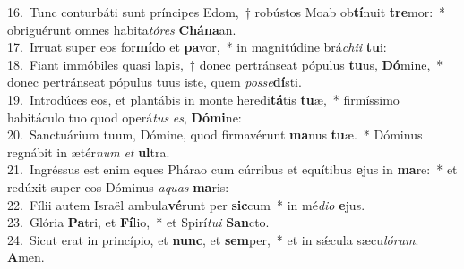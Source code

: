 {16.~}Tunc conturbáti sunt príncipes Edom,~† robústos Moab ob\textbf{tí}nuit \textbf{tre}mor:~* obriguérunt omnes habita\textit{tó}\textit{res} \textbf{Chá}\textbf{na}an.\\
{17.~}Irruat super eos for\textbf{mí}do et \textbf{pa}vor,~* in magnitúdine brá\textit{chi}\textit{i} \textbf{tu}i:\\
{18.~}Fiant immóbiles quasi lapis,~† donec pertránseat pópulus \textbf{tu}us, \textbf{Dó}mine,~* donec pertránseat pópulus tuus iste, quem \textit{pos}\textit{se}\textbf{dí}sti.\\
{19.~}Introdúces eos, et plantábis in monte heredi\textbf{tá}tis \textbf{tu}æ,~* firmíssimo habitáculo tuo quod operá\textit{tus} \textit{es}, \textbf{Dó}\textbf{mi}ne:\\
{20.~}Sanctuárium tuum, Dómine, quod firmavérunt \textbf{ma}nus \textbf{tu}æ.~* Dóminus regnábit in ætér\textit{num} \textit{et} \textbf{ul}tra.\\
{21.~}Ingréssus est enim eques Phárao cum cúrribus et equítibus \textbf{e}jus in \textbf{ma}re:~* et redúxit super eos Dóminus \textit{a}\textit{quas} \textbf{ma}ris:\\
{22.~}Fílii autem Israël ambula\textbf{vé}runt per \textbf{sic}cum~* in mé\textit{di}\textit{o} \textbf{e}jus.\\
{23.~}Glória \textbf{Pa}tri, et \textbf{Fí}lio,~* et Spirí\textit{tu}\textit{i} \textbf{San}cto.\\
{24.~}Sicut erat in princípio, et \textbf{nunc}, et \textbf{sem}per,~* et in sǽcula sæcu\textit{ló}\textit{rum}. \textbf{A}men.\\
